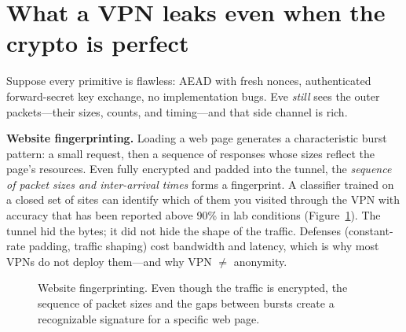 \section{What a VPN leaks even when the crypto is perfect}
\label{ch30:trafficanalysis}

Suppose every primitive is flawless: AEAD with fresh nonces, authenticated forward-secret key exchange, no implementation bugs. Eve \emph{still} sees the outer packets---their sizes, counts, and timing---and that side channel is rich.

\begin{attackbox}
\textbf{Website fingerprinting.} Loading a web page generates a characteristic burst pattern: a small request, then a sequence of responses whose sizes reflect the page's resources. Even fully encrypted and padded into the tunnel, the \emph{sequence of packet sizes and inter-arrival times} forms a fingerprint. A classifier trained on a closed set of sites can identify which of them you visited through the VPN with accuracy that has been reported above 90\% in lab conditions (Figure~\ref{fig:ch30:fingerprinting}). The tunnel hid the bytes; it did not hide the shape of the traffic.
Defenses (constant-rate padding, traffic shaping) cost bandwidth and latency, which is why most VPNs do not deploy them---and why VPN \(\neq\) anonymity.
\end{attackbox}

\begin{figure}[htbp]
\centering
{}
\caption{Website fingerprinting. Even though the traffic is encrypted, the sequence of packet sizes and the gaps between bursts create a recognizable signature for a specific web page.}
\label{fig:ch30:fingerprinting}
\end{figure}

